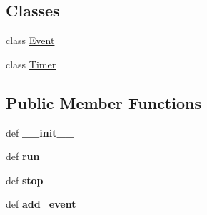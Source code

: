 \subsection*{Classes}
\begin{DoxyCompactItemize}
\item 
class \hyperlink{classcore_1_1misc_1_1event_1_1_event_loop_1_1_event}{Event}
\item 
class \hyperlink{classcore_1_1misc_1_1event_1_1_event_loop_1_1_timer}{Timer}
\end{DoxyCompactItemize}
\subsection*{Public Member Functions}
\begin{DoxyCompactItemize}
\item 
\hypertarget{classcore_1_1misc_1_1event_1_1_event_loop_a48a8d3ea87114a993763100c383737a5}{def {\bfseries \+\_\+\+\_\+init\+\_\+\+\_\+}}\label{classcore_1_1misc_1_1event_1_1_event_loop_a48a8d3ea87114a993763100c383737a5}

\item 
\hypertarget{classcore_1_1misc_1_1event_1_1_event_loop_a0b8e883ff427e1c068bafa1ae68c3cdf}{def {\bfseries run}}\label{classcore_1_1misc_1_1event_1_1_event_loop_a0b8e883ff427e1c068bafa1ae68c3cdf}

\item 
\hypertarget{classcore_1_1misc_1_1event_1_1_event_loop_a3197fe503c119c310da3a99589192a7c}{def {\bfseries stop}}\label{classcore_1_1misc_1_1event_1_1_event_loop_a3197fe503c119c310da3a99589192a7c}

\item 
\hypertarget{classcore_1_1misc_1_1event_1_1_event_loop_a843e0f9b063b35ffcde67521921c387f}{def {\bfseries add\+\_\+event}}\label{classcore_1_1misc_1_1event_1_1_event_loop_a843e0f9b063b35ffcde67521921c387f}

\end{DoxyCompactItemize}

